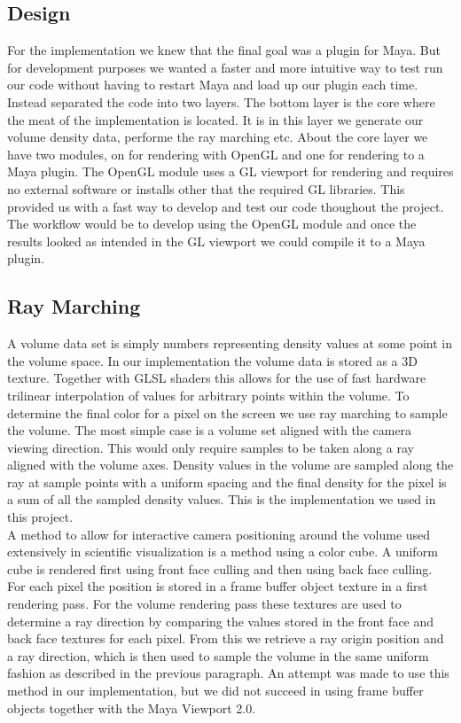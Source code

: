 \documentclass[11pt,twocolumn]{article}
\begin{document}
\subsection{Design}
For the implementation we knew that the final goal was a plugin for Maya.
But for development purposes we wanted a faster and more intuitive way to test run our code without having to restart Maya and load up our plugin each time.
Instead separated the code into two layers. The bottom layer is the core where the meat of the implementation is located. It is in this layer we generate our volume density data, performe the ray marching etc. About the core layer we have two modules, on for rendering with OpenGL and one for rendering to a Maya plugin. The OpenGL module uses a GL viewport for rendering and requires no external software or installs other that the required GL libraries. This provided us with a fast way to develop and test our code thoughout the project. The workflow would be to develop using the OpenGL module and once the results looked as intended in the GL viewport we could compile it to a Maya plugin.
\subsection{Ray Marching}
A volume data set is simply numbers representing density values at some point in the volume space.
In our implementation the volume data is stored as a 3D texture.
Together with GLSL shaders this allows for the use of fast hardware trilinear interpolation of values for arbitrary points within the volume. To determine the final color for a pixel on the screen we use ray marching to sample the volume.
The most simple case is a volume set aligned with the camera viewing direction.
This would only require samples to be taken along a ray aligned with the volume axes.
Density values in the volume are sampled along the ray at sample points with a uniform spacing and the final density for the pixel is a sum of all the sampled density values.
This is the implementation we used in this project.
\\
A method to allow for interactive camera positioning around the volume used extensively in scientific visualization is a method using a color cube.
A uniform cube is rendered first using front face culling and then using back face culling.
For each pixel the position is stored in a frame buffer object texture in a first rendering pass.
For the volume rendering pass these textures are used to determine a ray direction by comparing the values stored in the front face and back face textures for each pixel. From this we retrieve a ray origin position and a ray direction, which is then used to sample the volume in the same uniform fashion as described in the previous paragraph. An attempt was made to use this method in our implementation, but we did not succeed in using frame buffer objects together with the Maya Viewport 2.0.
\end{document}
